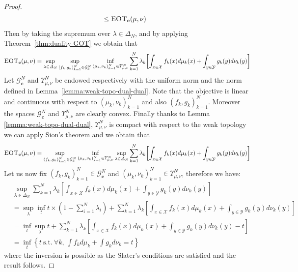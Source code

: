 \begin{proof}
\begin{align*}
  &\leq \textsc{EOT}_{\mathbf{c}}(\mu,\nu)
\end{align*}
Then by taking the supremum over $\lambda\in\Delta_N$, and by applying Theorem~\ref{thm:duality-GOT} we obtain that
\begin{align*}
\MOT_{\mathbf{c}}(\mu,\nu)
 =\sup_{\lambda\in \Delta_N} \sup\limits_{(f_k,g_k)_{k=1}^N\in  \mathcal{G}^{N}_{\mathbf{c}}} \inf_{(\mu_k,\nu_k)_{k=1}^N\in\Upsilon_{\mu,\nu}^N } \sum_{k=1}^N \lambda_k \left[\int_{x\in\mathcal{X}} f_k(x)d\mu_k(x)+ \int_{y\in\mathcal{Y}} g_k(y)d\nu_k(y)\right]
\end{align*}
Let $\mathcal{G}^{N}_{\mathbf{c}}$ and $\Upsilon_{\mu,\nu}^N$ be endowed respectively with the uniform norm and the norm defined in Lemma~\ref{lemma:weak-topo-dual-dual}. Note that the objective is linear and continuous with respect to $(\mu_k,\nu_k)_{k=1}^N$ and also $(f_k,g_k)_{k=1}^N$. Moreover the spaces $\mathcal{G}^{N}_{\mathbf{c}}$ and $\Upsilon_{\mu,\nu}^N$ are clearly convex. Finally thanks to Lemma \ref{lemma:weak-topo-dual-dual}, $\Upsilon_{\mu,\nu}^N$ is compact with respect to the weak topology we can apply Sion's theorem \cite{sion1958} and we obtain that
\begin{align*}
\MOT_{\mathbf{c}}(\mu,\nu)
 = \sup\limits_{(f_k,g_k)_{k=1}^N\in  \mathcal{G}^{N}_{\mathbf{c}}} \inf_{(\mu_k,\nu_k)_{k=1}^N\in\Upsilon_{\mu,\nu}^N }\sup_{\lambda\in \Delta_N}  \sum_{k=1}^N \lambda_k \left[\int_{x\in\mathcal{X}} f_k(x)d\mu_k(x)+ \int_{y\in\mathcal{Y}} g_k(y)d\nu_k(y)\right]
\end{align*}
Let us now fix $(f_k,g_k)_{k=1}^N\in  \mathcal{G}^{N}_{\mathbf{c}}$ and $(\mu_k,\nu_k)_{k=1}^N\in\Upsilon_{\mu,\nu}^N$, therefore we have:
\begin{align*}
    &\sup_{\lambda\in \Delta_N}  \sum_{k=1}^N \lambda_k \left[\int_{x\in\mathcal{X}} f_k(x)d\mu_k(x)+ \int_{y\in\mathcal{Y}} g_k(y)d\nu_k(y)\right] \\
    &=\sup_{\lambda}\inf_{t}  t\times\left(1-\sum_{i=1}^N \lambda_i \right) + \sum_{k=1}^N \lambda_k \left[\int_{x\in\mathcal{X}} f_k(x)d\mu_k(x)+ \int_{y\in\mathcal{Y}} g_k(y)d\nu_k(y)\right]\\
     &=\inf_{t} \sup_{\lambda} t + \sum_{k=1}^N \lambda_k \left[\int_{x\in\mathcal{X}} f_k(x)d\mu_k(x)+ \int_{y\in\mathcal{Y}} g_k(y)d\nu_k(y)- t\right]\\
     &= \inf_{t} \left\{t~\mathrm{ s.t.}~\forall k, ~ \int f_kd\mu_k+ \int g_kd\nu_k = t \right\}
\end{align*}
where the inversion is possible as the Slater's conditions are satisfied  and the result follows.
\end{proof}

